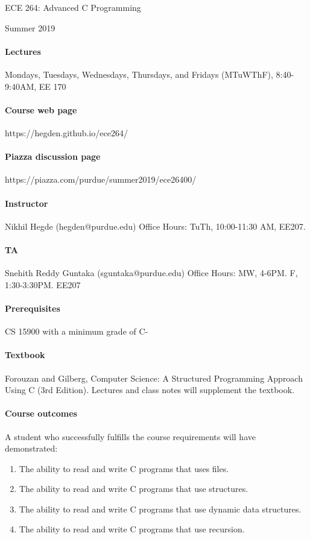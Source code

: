 \documentclass{article}
\begin{document}
\begin{center}{\LARGE ECE 264: Advanced C Programming} \end{center}
\begin{center}{\large Summer 2019} \end{center}

\bigskip

\paragraph{Lectures}
Mondays, Tuesdays, Wednesdays, Thursdays, and Fridays (MTuWThF), 8:40-9:40AM, EE 170
\paragraph{Course web page} https://hegden.github.io/ece264/
\paragraph{Piazza discussion page} https://piazza.com/purdue/summer2019/ece26400/

\paragraph{Instructor}
Nikhil Hegde (hegden@purdue.edu)
Office Hours: TuTh, 10:00-11:30 AM, EE207.

\paragraph{TA}
Snehith Reddy Guntaka (sguntaka@purdue.edu)
Office Hours: MW, 4-6PM. F, 1:30-3:30PM. EE207

\paragraph{Prerequisites} CS 15900 with a minimum grade of C-
\paragraph{Textbook} Forouzan and Gilberg, Computer Science: A Structured Programming Approach Using C (3rd Edition). Lectures and class notes will supplement the textbook.
\paragraph{Course outcomes} A student who successfully fulfills the course requirements will have demonstrated:
\begin{enumerate}
\item The ability to read and write C programs that uses files. 
\item The ability to read and write C programs that use structures. 
\item The ability to read and write C programs that use dynamic data structures.
\item The ability to read and write C programs that use recursion. 
\end{enumerate}
\end{document}
